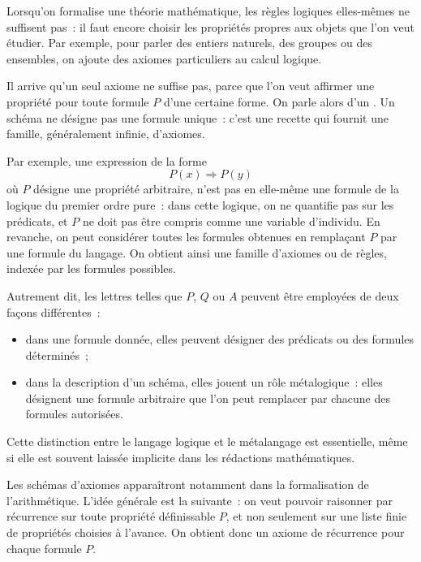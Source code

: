 
\thingy
Lorsqu'on formalise une théorie mathématique, les règles logiques
elles-mêmes ne suffisent pas : il faut encore choisir les propriétés
propres aux objets que l'on veut étudier.  Par exemple, pour parler des
entiers naturels, des groupes ou des ensembles, on ajoute des axiomes
particuliers au calcul logique.

Il arrive qu'un seul axiome ne suffise pas, parce que l'on veut affirmer
une propriété pour toute formule $P$ d'une certaine forme.  On parle
alors d'un .  Un schéma ne désigne pas une
formule unique : c'est une recette qui fournit une famille, généralement
infinie, d'axiomes.

\thingy
Par exemple, une expression de la forme
\[
P(x)\Rightarrow P(y)
\]
où $P$ désigne une propriété arbitraire, n'est pas en elle-même une
formule de la logique du premier ordre pure : dans cette logique, on ne
quantifie pas sur les prédicats, et $P$ ne doit pas être compris comme
une variable d'individu.  En revanche, on peut considérer toutes les
formules obtenues en remplaçant $P$ par une formule du langage.  On
obtient ainsi une famille d'axiomes ou de règles, indexée par les
formules possibles.

Autrement dit, les lettres telles que $P$, $Q$ ou $A$ peuvent être
employées de deux façons différentes :
\begin{itemize}
\item dans une formule donnée, elles peuvent désigner des prédicats ou
  des formules déterminés ;
\item dans la description d'un schéma, elles jouent un rôle
  métalogique : elles désignent une formule arbitraire que l'on peut
  remplacer par chacune des formules autorisées.
\end{itemize}

Cette distinction entre le langage logique et le métalangage est
essentielle, même si elle est souvent laissée implicite dans les
rédactions mathématiques.

\thingy
Les schémas d'axiomes apparaîtront notamment dans la formalisation de
l'arithmétique.  L'idée générale est la suivante : on veut pouvoir
raisonner par récurrence sur toute propriété définissable $P$, et non
seulement sur une liste finie de propriétés choisies à l'avance.  On
obtient donc un axiome de récurrence pour chaque formule $P$.

